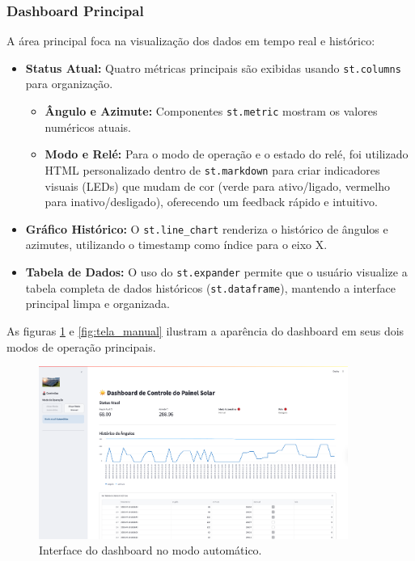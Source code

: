 \documentclass{article}
\begin{document}
\subsubsection{Dashboard Principal}
A área principal foca na visualização dos dados em tempo real e histórico:
\begin{itemize}
    \item \textbf{Status Atual:} Quatro métricas principais são exibidas usando \texttt{st.columns} para organização.
    \begin{itemize}
        \item \textbf{Ângulo e Azimute:} Componentes \texttt{st.metric} mostram os valores numéricos atuais.
        \item \textbf{Modo e Relé:} Para o modo de operação e o estado do relé, foi utilizado HTML personalizado dentro de \texttt{st.markdown} para criar indicadores visuais (LEDs) que mudam de cor (verde para ativo/ligado, vermelho para inativo/desligado), oferecendo um feedback rápido e intuitivo.
    \end{itemize}
    \item \textbf{Gráfico Histórico:} O \texttt{st.line\_chart} renderiza o histórico de ângulos e azimutes, utilizando o timestamp como índice para o eixo X.
    \item \textbf{Tabela de Dados:} O uso do \texttt{st.expander} permite que o usuário visualize a tabela completa de dados históricos (\texttt{st.dataframe}), mantendo a interface principal limpa e organizada.
\end{itemize}

As figuras \ref{fig:tela_automatico} e \ref{fig:tela_manual} ilustram a aparência do dashboard em seus dois modos de operação principais.

\begin{figure}[H]
    \centering
    \includegraphics[width=0.9\textwidth]{tela_modo_automatico.png}
    \caption{Interface do dashboard no modo automático.}
    \label{fig:tela_automatico}
\end{figure}
\end{document}
